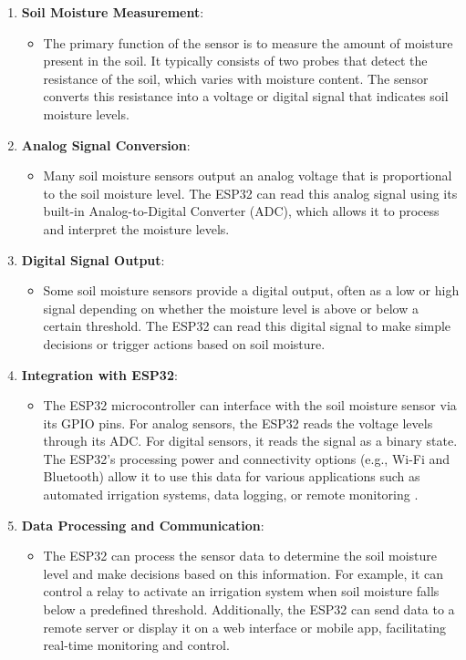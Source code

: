 \begin{enumerate}[label=\arabic*.]
	\item \textbf{Soil Moisture Measurement}:
	\begin{itemize}
		\item The primary function of the sensor is to measure the amount of moisture present in the soil. It typically consists of two probes that detect the resistance of the soil, which varies with moisture content. The sensor converts this resistance into a voltage or digital signal that indicates soil moisture levels.
	\end{itemize}
	
	\item \textbf{Analog Signal Conversion}:
	\begin{itemize}
		\item Many soil moisture sensors output an analog voltage that is proportional to the soil moisture level. The ESP32 can read this analog signal using its built-in Analog-to-Digital Converter (ADC), which allows it to process and interpret the moisture levels.
	\end{itemize}
	
	\item \textbf{Digital Signal Output}:
	\begin{itemize}
		\item Some soil moisture sensors provide a digital output, often as a low or high signal depending on whether the moisture level is above or below a certain threshold. The ESP32 can read this digital signal to make simple decisions or trigger actions based on soil moisture.
	\end{itemize}
	
	\item \textbf{Integration with ESP32}:
	\begin{itemize}
		\item The ESP32 microcontroller can interface with the soil moisture sensor via its GPIO pins. For analog sensors, the ESP32 reads the voltage levels through its ADC. For digital sensors, it reads the signal as a binary state. The ESP32’s processing power and connectivity options (e.g., Wi-Fi and Bluetooth) allow it to use this data for various applications such as automated irrigation systems, data logging, or remote monitoring \cite{Didi:2022}.
	\end{itemize}
	
	\item \textbf{Data Processing and Communication}:
	\begin{itemize}
		\item The ESP32 can process the sensor data to determine the soil moisture level and make decisions based on this information. For example, it can control a relay to activate an irrigation system when soil moisture falls below a predefined threshold. Additionally, the ESP32 can send data to a remote server or display it on a web interface or mobile app, facilitating real-time monitoring and control.
	\end{itemize}
	

\end{enumerate}
